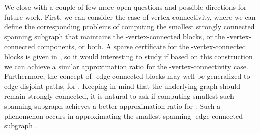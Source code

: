 \documentclass[11pt]{article}
\begin{document}
We close with a couple of few more open questions and possible directions for future work.
First, we can consider the case of vertex-connectivity, where we can define the corresponding problems of computing the smallest strongly connected spanning subgraph that maintains the -vertex-connected blocks, or
the -vertex-connected components, or both.
A sparse certificate for the -vertex-connected blocks is given in \cite{2VCB}, so it would interesting to study if based on this construction we can achieve a similar approximation ratio for the -vertex-connectivity case.
Furthermore, the concept of -edge-connected blocks may well be generalized to -edge disjoint paths, for .
Keeping in mind that the underlying graph should remain strongly connected, it is natural to ask if computing smallest such spanning subgraph achieves a better approximation ratio for .
Such a phenomenon occurs in approximating the smallest spanning -edge connected subgraph \cite{CT00,GGTW:kECSS:2009}.





\end{document}
